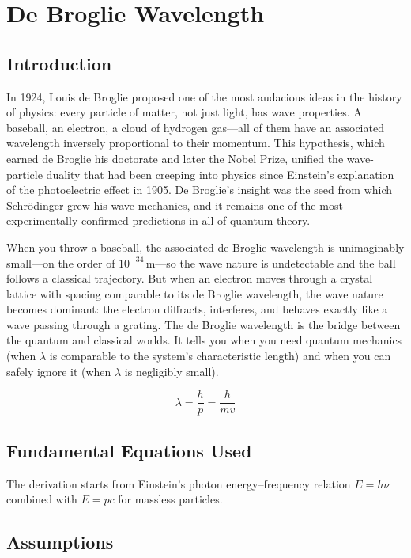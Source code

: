 \chapter{De Broglie Wavelength}

\section*{Introduction}

In 1924, Louis de Broglie proposed one of the most audacious ideas in the history of physics: every particle of matter, not just light, has wave properties. A baseball, an electron, a cloud of hydrogen gas---all of them have an associated wavelength inversely proportional to their momentum. This hypothesis, which earned de Broglie his doctorate and later the Nobel Prize, unified the wave-particle duality that had been creeping into physics since Einstein's explanation of the photoelectric effect in 1905. De Broglie's insight was the seed from which Schrödinger grew his wave mechanics, and it remains one of the most experimentally confirmed predictions in all of quantum theory.

When you throw a baseball, the associated de Broglie wavelength is unimaginably small---on the order of $10^{-34}\,\text{m}$---so the wave nature is undetectable and the ball follows a classical trajectory. But when an electron moves through a crystal lattice with spacing comparable to its de Broglie wavelength, the wave nature becomes dominant: the electron diffracts, interferes, and behaves exactly like a wave passing through a grating. The de Broglie wavelength is the bridge between the quantum and classical worlds. It tells you when you need quantum mechanics (when $\lambda$ is comparable to the system's characteristic length) and when you can safely ignore it (when $\lambda$ is negligibly small).


\begin{equation}
\lambda = \frac{h}{p} = \frac{h}{mv}
\end{equation}

\section*{Fundamental Equations Used}

The derivation starts from Einstein's photon energy--frequency relation $E = h\nu$ combined with $E = pc$ for massless particles.

\section*{Assumptions}

